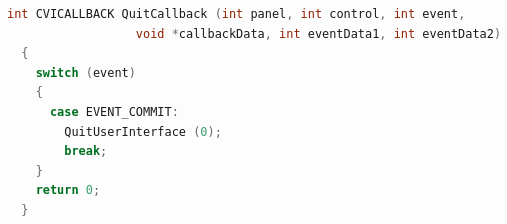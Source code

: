 \documentclass[a4paper,12pt,twoside]{article}%
\begin{document}
\begin{lstlisting}[language=C]
  int CVICALLBACK QuitCallback (int panel, int control, int event,
                  void *callbackData, int eventData1, int eventData2)
  {
    switch (event)
    {
      case EVENT_COMMIT:
        QuitUserInterface (0);
        break;
    }
    return 0;
  }  
\end{lstlisting}  
\end{document}
